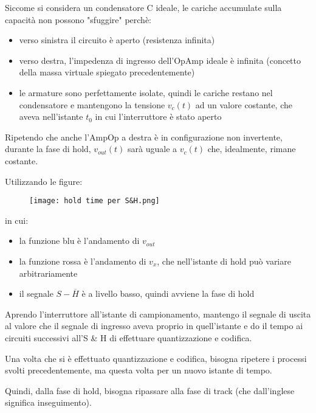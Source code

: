Siccome si considera un condensatore C ideale, le cariche accumulate sulla capacità non possono "sfuggire" perchè: 

\begin{itemize}
    \item verso sinistra il circuito è aperto (resistenza infinita) 
    \item verso destra, l'impedenza di ingresso dell'OpAmp ideale è infinita (concetto della massa virtuale spiegato precedentemente) 
    \item le armature sono perfettamente isolate, quindi le cariche restano nel condensatore e mantengono la tensione $v_c (t)$ ad un valore costante, che aveva nell'istante $t_0$ in cui l'interruttore è stato aperto
\end{itemize}

Ripetendo che anche l'AmpOp a destra è in configurazione non invertente, durante la fase di hold, $v_{out} (t)$ sarà uguale a $v_c (t)$ 
che, idealmente, rimane costante. \newline 

Utilizzando le figure: 

\begin{figure}[h]
    \centering
    \texttt{[image: hold time per S\&H.png]}
\end{figure}

in cui: 

\begin{itemize}
    \item la funzione blu è l'andamento di $v_{out}$ 
    \item la funzione rossa è l'andamento di $v_x$, che nell'istante di hold può variare arbitrariamente 
    \item il segnale $S - \overline{H}$ è a livello basso, quindi avviene la fase di hold
\end{itemize}

Aprendo l'interruttore all'istante di campionamento, 
mantengo il segnale di uscita al valore che il segnale di ingresso aveva proprio in quell'istante e do il tempo ai circuiti successivi 
all'S \& H di effettuare quantizzazione e codifica. \newline 

Una volta che si è effettuato quantizzazione e codifica, bisogna ripetere i processi svolti precedentemente, 
ma questa volta per un nuovo istante di tempo. \newline 

Quindi, dalla fase di hold, bisogna ripassare alla fase di track (che dall'inglese significa inseguimento). \newline 

